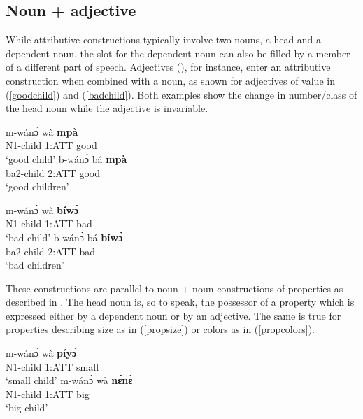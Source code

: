 \subsection{Noun + adjective}
\label{sec:NQUAL}

While attributive constructions typically involve two nouns, a head and a dependent noun, the slot for the dependent noun can also be filled by a member of a different part of speech. Adjectives (), for instance, enter an attributive construction when combined with a noun, as shown for adjectives of value in (\ref{goodchild}) and (\ref{badchild}). Both examples show the change in number/class of the head noun while the adjective is invariable. 

\begin{exe}
\ex\label{goodchild}
\begin{xlist}
\ex\label{goodchild1}
 \gll  m-wánɔ̀ wà {\bfseries mpà} \\
          N1-child 1:ATT good  \\
    \trans `good child'
\ex \label{goodchild2}
  \gll    b-wánɔ̀ bá {\bfseries mpà} \\
              ba2-child 2:ATT good \\
    \trans `good children'
\end {xlist}
\end {exe}

\begin{exe}
\ex\label{badchild}
\begin{xlist}
\ex\label{badchild1}
 \gll  m-wánɔ̀ wà {\bfseries bíwɔ̀} \\
          N1-child 1:ATT bad  \\
    \trans `bad child'
\ex \label{badchild2}
  \gll    b-wánɔ̀ bá {\bfseries bíwɔ̀} \\
              ba2-child 2:ATT bad \\
    \trans `bad children'
\end {xlist}
\end {exe}

\noindent These constructions are parallel to noun + noun constructions of properties as described in . The head noun is, so to speak, the possessor of a property which is expressed either by a dependent noun or by an adjective. 
The same is true for properties describing size as in (\ref{propsize}) or colors as in (\ref{propcolors}).

\begin{exe}
\ex\label{propsize}
\begin{xlist}
\ex\label{propsize1}
 \gll  m-wánɔ̀ wà {\bfseries píyɔ̀} \\
          N1-child 1:ATT small  \\
    \trans `small child'
\ex \label{propsize2}
  \gll    m-wánɔ̀ wà {\bfseries nɛ́nɛ̀} \\
              N1-child 1:ATT big \\
    \trans `big child'
\end {xlist}
\end {exe}

